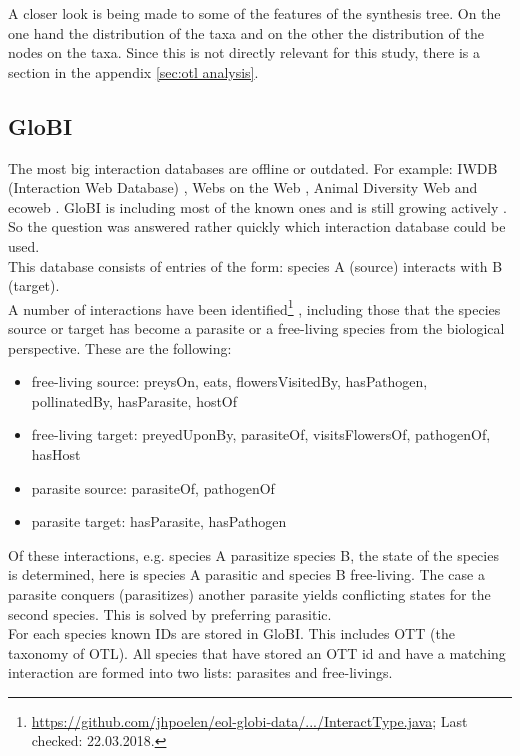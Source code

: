       A closer look is being made to some of the features of the synthesis tree. On the one hand the 
        distribution of the taxa and on the other the distribution of the nodes on the taxa. Since this 
        is not directly relevant for this study, there is a section in the appendix 
        \ref{sec:otl analysis}.

    \subsection{GloBI}
      The most big interaction databases are offline or outdated. For example: IWDB (Interaction Web 
        Database) \cite{IWDB2003}, Webs on the Web \cite{WOW2004}, Animal Diversity Web \cite{Myers2003} 
        and ecoweb \cite{Cohen2010}. GloBI is including most of the known ones and is still growing 
        actively \cite{Poelen2014}. So the question was answered rather quickly which interaction 
        database could be used. \\

      This database consists of entries of the form: species A (source) interacts with B (target). \\
      A number of interactions have been identified\footnote{\hyperlink{
        https://github.com/jhpoelen/eol-globi-data/blob/master/eol-globi-lib/src/main/java/org/eol/globi/domain/InteractType.java
        }{https://github.com/jhpoelen/eol-globi-data/.../InteractType.java}; Last checked: 22.03.2018.}
        , including those that the species source or target has become a parasite or a free-living 
        species from the biological perspective. These are the following:
      \begin{itemize}
        \item free-living source: preysOn, eats, flowersVisitedBy, hasPathogen, pollinatedBy, 
          hasParasite, hostOf
        \item free-living target: preyedUponBy, parasiteOf, visitsFlowersOf, pathogenOf, hasHost
        \item parasite source: parasiteOf, pathogenOf
        \item parasite target: hasParasite, hasPathogen
      \end{itemize}
      Of these interactions, e.g. species A parasitize species B, the state of the species is 
        determined, here is species A parasitic and species B free-living. The case a parasite 
        conquers (parasitizes) another parasite yields conflicting states for the second species. 
        This is solved by preferring parasitic. \\
      For each species known IDs are stored in GloBI. This includes OTT (the taxonomy of OTL). All 
        species that have stored an OTT id and have a matching interaction are formed into two lists: 
        parasites and free-livings.

